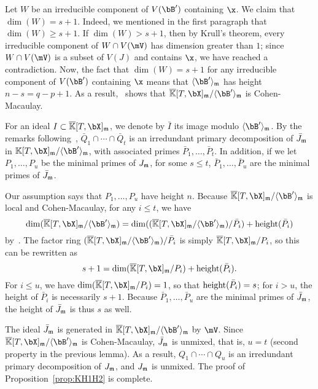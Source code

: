 \documentclass[12pt]{article}
\begin{document}
Let $W$ be an irreducible component of $V(\bB')$ containing $\x$.  We
claim that $\dim(W)=s+1$. Indeed, we mentioned in the first paragraph
that $\dim(W) \ge s+1$. If $\dim(W) > s+1$, then by Krull's theorem,
every irreducible component of $W \cap V(\mV)$ has dimension greater
than $1$; since $W \cap V(\mV)$ is a subset of $V(J)$ and contains $\x$,
we have reached a contradiction. Now, the fact that $\dim(W)=s+1$ for
any irreducible component of $V(\bB')$ containing $\x$ means that
$\langle \bB' \rangle_\m$ has height $n-s=q-p+1$.  As a
result,~\cite[Theorem~18.18]{Eisenbud95} shows that
$\KKbar[T,\bX]_\m/\langle \bB' \rangle_\m$ is Cohen-Macaulay.

For an ideal $I \subset \KKbar[T,\bX]_\m$, we denote by $\bar I$ its
image modulo $\langle \bB' \rangle_\m$.  By the remarks
following~\cite[Theorem~IV.5.9]{ZaSa58},
$\bar Q_1 \cap \cdots \cap \bar Q_t$ is an irredundant primary
decomposition of $\bar J_{\mathfrak{m}}$ in
$\KK[T,\bX]_\m/\langle \bB' \rangle_\m$, with associated primes
$\bar P_1,\dots,\bar P_t$. In addition, if we let $P_1,\dots,P_u$ be
the minimal primes of $J_{\mathfrak{m}}$, for some $s \le t$,
$\bar P_1,\dots,\bar P_u$ are the minimal primes of $\bar J_{\mathfrak{m}}$.

Our assumption says that $P_1,\dots,P_u$ have height $n$. Because
$\KKbar[T,\bX]_\m/\langle \bB' \rangle_\m$ is local and Cohen-Macaulay, for any
$i \le t$, we have 
$$\dim(\KKbar[T,\bX]_\m/\langle \bB' \rangle_\m)=\dim((\KKbar[T,\bX]_\m/\langle \bB' \rangle_\m) / \bar P_i) + {\rm height}(\bar P_i)$$
by~\cite[Theorem~17.4(i)]{Matsumura86}.
The factor ring $(\KKbar[T,\bX]_\m/\langle \bB' \rangle_\m) / \bar P_i$ is simply
$\KKbar[T,\bX]_\m/P_i$, so this can be rewritten as
$$s+1 = \dim(\KKbar[T,\bX]_\m/P_i) + {\rm height}(\bar P_i).$$ For $i\le
u$, we have $\dim(\KKbar[T,\bX]_\m/P_i)=1$, so that ${\rm height}(\bar
P_i)=s$; for $i > u$, the height of $\bar P_i$ is necessarily
$s+1$. Because $\bar P_1,\dots,\bar P_u$ are the minimal primes of
$\bar J_{\mathfrak{m}}$, the height of $\bar J_{\mathfrak{m}}$ is thus $s$ as well.

The ideal $\bar J_{\mathfrak{m}}$ is generated in $\KKbar[T,\bX]_\m/\langle \bB'
\rangle_\m$ by $\mV$. Since $\KKbar[T,\bX]_\m/\langle
\bB' \rangle_\m$ is Cohen-Macaulay, $\bar J_{\mathfrak{m}}$ is unmixed, that is,
$u=t$ (second property in the previous lemma).  As a result, $Q_1 \cap
\cdots \cap Q_u$ is an irredundant primary decomposition of $J_{\mathfrak{m}}$,
and $J_{\mathfrak{m}}$ is unmixed. The proof of Proposition~\ref{prop:KH1H2} is complete.

\end{document}

